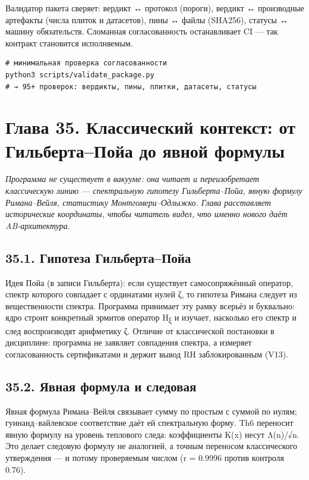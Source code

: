 \documentclass[11pt,a4paper]{article}
\begin{document}
Валидатор пакета сверяет: вердикт ↔ протокол (пороги), вердикт ↔ производные артефакты (числа плиток и датасетов), пины ↔ файлы (SHA256), статусы ↔ машину обязательств. Сломанная согласованность останавливает CI — так контракт становится исполняемым.

\begin{verbatim}
# минимальная проверка согласованности
python3 scripts/validate_package.py
# → 95+ проверок: вердикты, пины, плитки, датасеты, статусы
\end{verbatim}

\section{Глава 35. Классический контекст: от Гильберта–Пойа до явной формулы}

\noindent\textit{\color{copper}Программа не существует в вакууме: она читает и переизобретает классическую линию — спектральную гипотезу Гильберта–Пойа, явную формулу Римана–Вейля, статистику Монтгомери–Одлыжко. Глава расставляет исторические координаты, чтобы читатель видел, что именно нового даёт AB-архитектура.}

\subsection{35.1. Гипотеза Гильберта–Пойа}

Идея Пойа (в записи Гильберта): если существует самосопряжённый оператор, спектр которого совпадает с ординатами нулей ζ, то гипотеза Римана следует из вещественности спектра. Программа принимает эту рамку всерьёз и буквально: ядро строит конкретный эрмитов оператор H\textsubscript{ξ} и изучает, насколько его спектр и след воспроизводят арифметику ζ. Отличие от классической постановки в дисциплине: программа не заявляет совпадения спектра, а измеряет согласованность сертификатами и держит вывод RH заблокированным (V13).

\subsection{35.2. Явная формула и следовая}

Явная формула Римана–Вейля связывает сумму по простым с суммой по нулям; гуинанд–вайлевское соответствие даёт ей спектральную форму. Th6 переносит явную формулу на уровень теплового следа: коэффициенты K(x) несут Λ(n)/√n. Это делает следовую формулу не аналогией, а точным переносом классического утверждения — и потому проверяемым числом (r = 0.9996 против контроля 0.76).
\end{document}
